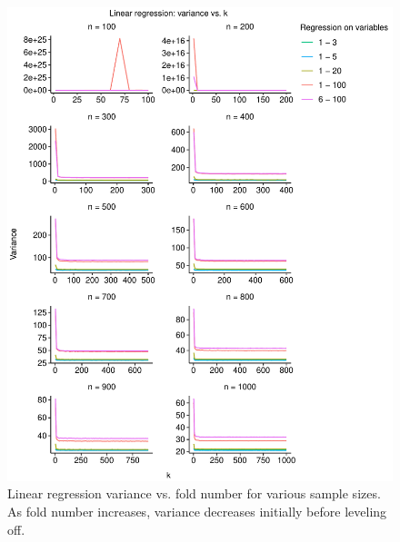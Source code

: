 \documentclass[
  12pt,
]{article}
\begin{document}
\begin{figure}[H]

{\centering \includegraphics{manuscript_files/figure-latex/unnamed-chunk-2-1} 

}

\caption{Linear regression variance vs. fold number for various sample sizes. As fold number increases, variance decreases initially before leveling off.}\label{fig:unnamed-chunk-2}
\end{figure}
\end{document}
